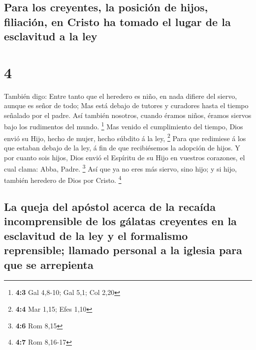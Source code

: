 \hypertarget{para-los-creyentes-la-posiciuxf3n-de-hijos-filiaciuxf3n-en-cristo-ha-tomado-el-lugar-de-la-esclavitud-a-la-ley}{%
\subsection{Para los creyentes, la posición de hijos, filiación, en
Cristo ha tomado el lugar de la esclavitud a la
ley}\label{para-los-creyentes-la-posiciuxf3n-de-hijos-filiaciuxf3n-en-cristo-ha-tomado-el-lugar-de-la-esclavitud-a-la-ley}}

\hypertarget{section-3}{%
\section{4}\label{section-3}}

 También digo: Entre tanto que el heredero es niño, en
nada difiere del siervo, aunque es señor de todo;  Mas
está debajo de tutores y curadores hasta el tiempo señalado por el
padre.  Así también nosotros, cuando éramos niños, éramos
siervos bajo los rudimentos del mundo. \footnote{\textbf{4:3} Gal
  4,8-10; Gal 5,1; Col 2,20}  Mas venido el cumplimiento
del tiempo, Dios envió su Hijo, hecho de mujer, hecho súbdito á la ley,
\footnote{\textbf{4:4} Mar 1,15; Efes 1,10}  Para que
redimiese á los que estaban debajo de la ley, á fin de que recibiésemos
la adopción de hijos.  Y por cuanto sois hijos, Dios envió
el Espíritu de su Hijo en vuestros corazones, el cual clama: Abba,
Padre. \footnote{\textbf{4:6} Rom 8,15}  Así que ya no
eres más siervo, sino hijo; y si hijo, también heredero de Dios por
Cristo. \footnote{\textbf{4:7} Rom 8,16-17}

\hypertarget{la-queja-del-apuxf3stol-acerca-de-la-recauxedda-incomprensible-de-los-guxe1latas-creyentes-en-la-esclavitud-de-la-ley-y-el-formalismo-reprensible-llamado-personal-a-la-iglesia-para-que-se-arrepienta}{%
\subsection{La queja del apóstol acerca de la recaída incomprensible de
los gálatas creyentes en la esclavitud de la ley y el formalismo
reprensible; llamado personal a la iglesia para que se
arrepienta}\label{la-queja-del-apuxf3stol-acerca-de-la-recauxedda-incomprensible-de-los-guxe1latas-creyentes-en-la-esclavitud-de-la-ley-y-el-formalismo-reprensible-llamado-personal-a-la-iglesia-para-que-se-arrepienta}}

